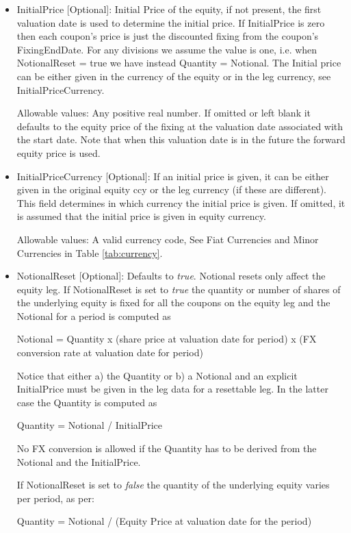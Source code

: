 \begin{itemize}
\item InitialPrice [Optional]: Initial Price of the equity, if not present, the first valuation date is used to
  determine the initial price. If InitialPrice is zero then each coupon's price is just the discounted fixing from the coupon's FixingEndDate. For any divisions we assume the value is one, i.e. when NotionalReset = true we have instead Quantity = Notional. The Initial price can be either given in the currency of the equity or in the leg
  currency, see InitialPriceCurrency.

Allowable values: Any positive real number. If omitted or left blank it defaults to the equity price of the fixing at the valuation date associated with the start date. Note that when this valuation date is in the future the forward equity price is used.

\item InitialPriceCurrency [Optional]: If an initial price is given, it can be either given in the original equity ccy
  or the leg currency (if these are different). This field determines in which currency the initial price is given. If
  omitted, it is assumed that the initial price is given in equity currency.

Allowable values: A valid currency code, See Fiat Currencies and Minor Currencies in Table \ref{tab:currency}.

\item NotionalReset [Optional]: Defaults to \emph{true}.  Notional resets only affect the equity leg. If NotionalReset
  is set to \emph{true} the quantity or number of shares of the underlying equity is fixed for all the coupons on the
  equity leg and the Notional for a period is computed as

  Notional = Quantity x (share price at valuation date for period) x (FX conversion rate at valuation date for period)

  Notice that either a) the Quantity or b) a Notional and an explicit InitialPrice must be given in the leg data for a
  resettable leg. In the latter case the Quantity is computed as

  Quantity = Notional / InitialPrice

  No FX conversion is allowed if the Quantity has to be derived from the Notional and the InitialPrice.

  If NotionalReset is set to \emph{false} the quantity of the underlying equity varies per period, as per:
  
  Quantity = Notional / (Equity Price at valuation date for the period)


\end{itemize}
